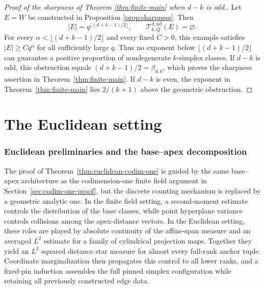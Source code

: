 \documentclass[11pt]{article}
\theoremstyle{remark}
\numberwithin{equation}{section}
\newcommand{\cT}{\mathcal T}
\newcommand{\1}{\mathbf 1}
\begin{document}
\begin{proof}[Proof of the sharpness of Theorem \ref{thm:finite-main} when $d-k$ is odd.]
Let \(E=W\) be constructed in Proposition \ref{prop:sharpness}. Then
\[
        |E|=q^{\lfloor(d+k-1)/2\rfloor},
        \qquad
        \cT^{d,\mathrm{nd}}_{k,Q}(E)=\varnothing.
\]
For every \(\alpha<\lfloor(d+k-1)/2\rfloor\) and every fixed \(C>0\), this example satisfies \(|E|\ge Cq^\alpha\) for all sufficiently large \(q\). Thus no exponent below \(\lfloor(d+k-1)/2\rfloor\) can guarantee a positive proportion of nondegenerate \(k\)-simplex classes. If \(d-k\) is odd, this obstruction equals $(d+k-1)/2=\beta_{d,k}$, which proves the sharpness assertion in Theorem~\ref{thm:finite-main}. If \(d-k\) is even, the exponent in Theorem~\ref{thm:finite-main} lies $2/(k+1)$ above the geometric obstruction.
\end{proof}



\clearpage
\part{The Euclidean setting}
\label{part:euclidean}

\section{Euclidean preliminaries and the base--apex decomposition}
\label{sec:euclidean-preliminaries}


The proof of Theorem~\ref{thm:euclidean-codim-one} is guided by the same
base--apex architecture as the codimension-one finite field argument in
Section~\ref{sec:codim-one-proof}, but the discrete counting mechanism is
replaced by a geometric analytic one.  In the finite field setting, a
second-moment estimate controls the distribution of the base classes,
while point hyperplane variance controls collisions among the
apex-distance vectors.  In the Euclidean setting, these roles are played
by absolute continuity of the affine-span measure and an averaged
\(L^2\) estimate for a family of cylindrical projection maps.  Together
they yield an \(L^2\) squared distance star measure for almost every
full-rank anchor tuple.  Coordinate marginalization then propagates this
control to all lower ranks, and a fixed-pin induction assembles the full
pinned simplex configuration while retaining all previously constructed
edge data.
\end{document}
